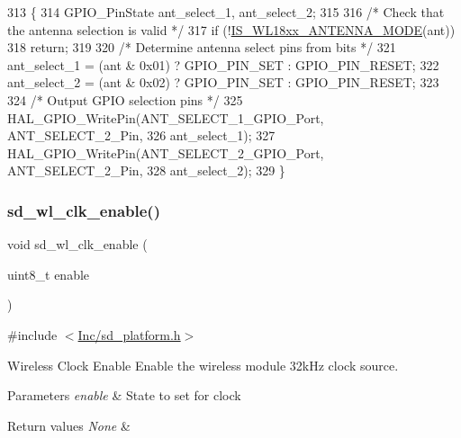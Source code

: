 \begin{DoxyCode}
313 \{
314     GPIO\_PinState ant\_select\_1, ant\_select\_2;
315  
316     \textcolor{comment}{/* Check that the antenna selection is valid */}
317     \textcolor{keywordflow}{if} (!\mbox{\hyperlink{group___s_d___platform___defines_ga4140f88e45c8ac3d94ec6ebd12950b27}{IS\_WL18xx\_ANTENNA\_MODE}}(ant))
318         \textcolor{keywordflow}{return};
319 
320     \textcolor{comment}{/* Determine antenna select pins from bits */}
321     ant\_select\_1 = (ant & 0x01) ? GPIO\_PIN\_SET : GPIO\_PIN\_RESET;
322     ant\_select\_2 = (ant & 0x02) ? GPIO\_PIN\_SET : GPIO\_PIN\_RESET;
323 
324     \textcolor{comment}{/* Output GPIO selection pins */}
325     HAL\_GPIO\_WritePin(ANT\_SELECT\_1\_GPIO\_Port, ANT\_SELECT\_2\_Pin,
326               ant\_select\_1);                           
327     HAL\_GPIO\_WritePin(ANT\_SELECT\_2\_GPIO\_Port, ANT\_SELECT\_2\_Pin,
328               ant\_select\_2);     
329 \}
\end{DoxyCode}
\mbox{\label{group___s_d___platform___function___declarations_ga3a5f60d707cd2405cf9f9a36c69de97d}} 
\subsubsection{\texorpdfstring{sd\+\_\+wl\+\_\+clk\+\_\+enable()}{sd\_wl\_clk\_enable()}}
{\footnotesize\ttfamily void sd\+\_\+wl\+\_\+clk\+\_\+enable (\begin{DoxyParamCaption}\item[{uint8\+\_\+t}]{enable }\end{DoxyParamCaption})}



{\ttfamily \#include $<$\mbox{\hyperlink{sd__platform_8h}{Inc/sd\+\_\+platform.\+h}}$>$}



Wireless Clock Enable Enable the wireless module 32k\+Hz clock source. 


\begin{DoxyParams}{Parameters}
{\em enable} & State to set for clock \\
\hline
\end{DoxyParams}

\begin{DoxyRetVals}{Return values}
{\em None} & \\
\hline
\end{DoxyRetVals}

